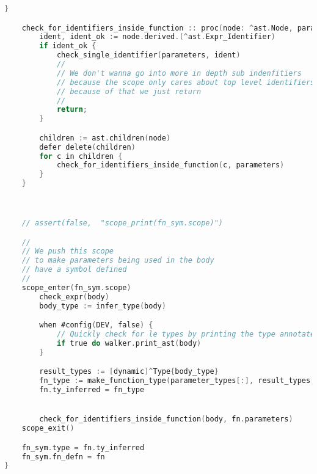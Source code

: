 \begin{codigo}[htb]
\begin{lstlisting}[language=C, inputencoding=utf8]
    }

    check_for_identifiers_inside_function :: proc(node: ^ast.Node, parameters: []^ast.Expr_Identifier,) {
        ident, ident_ok := node.derived.(^ast.Expr_Identifier)
        if ident_ok {
            check_single_identifier(parameters, ident)
            //
            // We don't wanna go into more in depth sub indenfitiers
            // because the scope only cares about top level identifiers
            // because of that we just return
            //
            return;
        }

        children := ast.children(node)
        defer delete(children)
        for c in children {
            check_for_identifiers_inside_function(c, parameters)
        }
    }



    // assert(false,  "scope_print(fn_sym.scope)")

    //
    // We push this scope
    // to make parameters being used in the body
    // have a symbol defined
    //
    scope_enter(fn_sym.scope)
        check_expr(body)
        body_type := infer_type(body)

        when #config(DEV, false) {
            // Quickly check for le types by printing the type annotated ast
            if true do walker.print_ast(body)
        }

        result_types := [dynamic]^Type{body_type}
        fn_type := make_function_type(parameter_types[:], result_types[:] )
        fn.ty_inferred = fn_type


        check_for_identifiers_inside_function(body, fn.parameters)
    scope_exit()

    fn_sym.type = fn.ty_inferred
    fn_sym.fn_defn = fn
}

\end{lstlisting}
\end{codigo}

